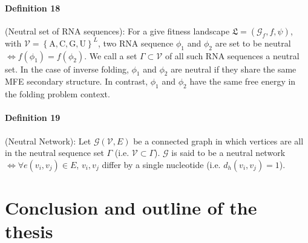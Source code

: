 \paragraph{\textbf{Definition 18}} (Neutral set of RNA sequences): For a give fitness landscape 
$\mathfrak{L} = (\mathcal{G}_f, f, \psi)$, with $\mathcal{V} = \left\{ \text{A}, \text{C}, \text{G}, \text{U} \right\}^L$, two RNA sequence $\phi_1$ and $\phi_2$  are set to be neutral $\iff f(\phi_1) = f(\phi_2)$. We call a set $\Gamma \subset \mathcal{V}$ of all such RNA sequences a neutral set.  In the case of inverse folding, $\phi_1$ and $\phi_2$ are neutral if they share the same MFE secondary structure. In contrast, $\phi_1$ and $\phi_2$ have the same free energy in the folding problem context. 

\paragraph{\textbf{Definition 19}} (Neutral Network): Let $\mathcal{G} (\mathcal{V}, E)$ be a connected graph in which vertices are all in the neutral sequence set $\Gamma$ (i.e. $\mathcal{V} \subset \Gamma$).  $\mathcal{G}$ is said to be a neutral network $\iff \forall e(v_i, v_j) \in E $,  $v_i,v_j$ differ by a single nucleotide (i.e. $d_h(v_i, v_j)=1$).






\section{Conclusion and outline of the thesis}

